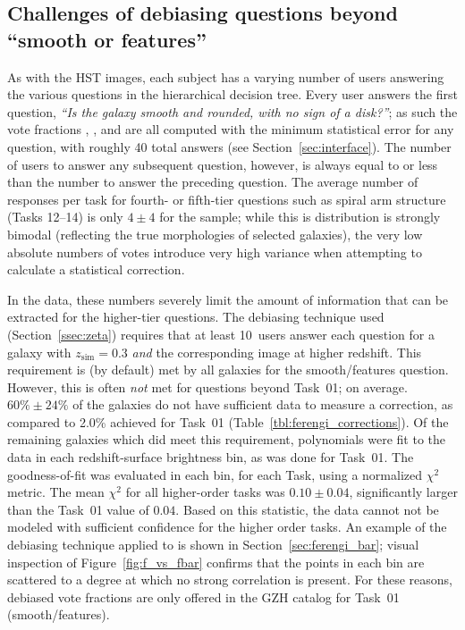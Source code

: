 \documentclass[twocolumn]{aastex6}
\begin{document}
\subsection{Challenges of debiasing questions beyond ``smooth or features''}
\label{ssec:higher_order_tasks}
As with the HST images, each \ferengi{} subject has a varying number of users answering the various questions in the hierarchical decision tree. Every user answers the first question, {\it ``Is the galaxy smooth and rounded, with no sign of a disk?''}; as such the vote fractions \fsmooth, \ffeatures, and \fartifact{} are all computed with the minimum statistical error for any question, with roughly 40 total answers (see Section~\ref{sec:interface}). The number of users to answer any subsequent question, however, is always equal to or less than the number to answer the preceding question. The average number of responses per task for fourth- or fifth-tier questions such as spiral arm structure (Tasks 12--14) is only $4\pm4$ for the \ferengi{} sample; while this is distribution is strongly bimodal (reflecting the true morphologies of selected galaxies), the very low absolute numbers of votes introduce very high variance when attempting to calculate a statistical correction.

In the \ferengi{} data, these numbers severely limit the amount of information that can be extracted for the higher-tier questions. The debiasing technique used (Section~\ref{ssec:zeta}) requires that at least 10~users answer each question for a galaxy with $z_\mathrm{sim}=0.3$ \emph{and} the corresponding image at higher redshift. This requirement is (by default) met by all galaxies for the smooth/features question. However, this is often \emph{not} met for questions beyond Task~01; on average. $60\%\pm24\%$ of the galaxies do not have sufficient data to measure a correction, as compared to 2.0\% achieved for Task~01 (Table~\ref{tbl:ferengi_corrections}). Of the remaining \ferengi{} galaxies which did meet this requirement, polynomials were fit to the data in each redshift-surface brightness bin, as was done for Task~01. The goodness-of-fit was evaluated in each bin, for each Task, using a normalized $\chi^2$ metric. The mean $\chi^2$ for all higher-order tasks was $0.10\pm0.04$, significantly larger than the Task~01 value of $0.04$. Based on this statistic, the data cannot not be modeled with sufficient confidence for the higher order tasks. An example of the debiasing technique applied to \fbar{} is shown in Section~\ref{sec:ferengi_bar}; visual inspection of Figure~\ref{fig:f_vs_fbar} confirms that the points in each bin are scattered to a degree at which no strong correlation is present. For these reasons, debiased vote fractions are only offered in the GZH catalog for Task~01 (smooth/features).  
\end{document}
